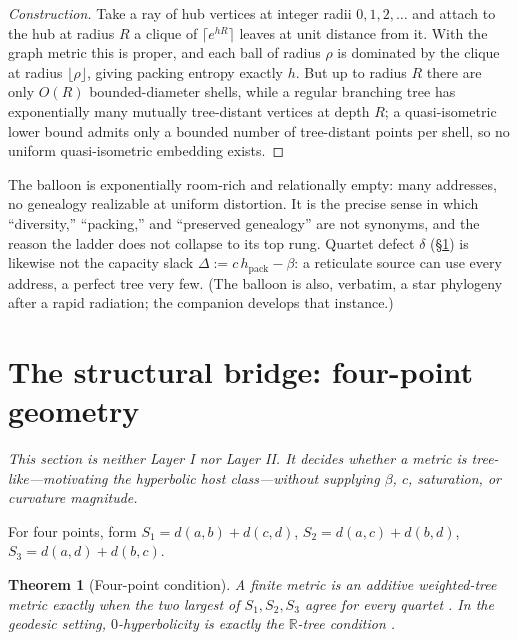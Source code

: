 \documentclass[11pt,reqno]{amsart}
\theoremstyle{plain}
\newtheorem{theorem}{Theorem}[section]
\theoremstyle{definition}
\newcommand{\hpack}{h_{\mathrm{pack}}}
\begin{document}
\begin{proof}[Construction]
Take a ray of hub vertices at integer radii $0,1,2,\dots$ and attach to the hub at radius $R$ a clique of $\lceil e^{hR}\rceil$ leaves at unit distance from it. With the graph metric this is proper, and each ball of radius $\rho$ is dominated by the clique at radius $\lfloor\rho\rfloor$, giving packing entropy exactly $h$. But up to radius $R$ there are only $O(R)$ bounded-diameter shells, while a regular branching tree has exponentially many mutually tree-distant vertices at depth $R$; a quasi-isometric lower bound admits only a bounded number of tree-distant points per shell, so no uniform quasi-isometric embedding exists.
\end{proof}

The balloon is exponentially room-rich and relationally empty: many addresses, no genealogy realizable at uniform distortion. It is the precise sense in which ``diversity,'' ``packing,'' and ``preserved genealogy'' are not synonyms, and the reason the ladder does not collapse to its top rung. Quartet defect $\delta$ (\S\ref{sec:classifier}) is likewise not the capacity slack $\Delta:=c\,\hpack-\beta$: a reticulate source can use every address, a perfect tree very few. (The balloon is also, verbatim, a star phylogeny after a rapid radiation; the companion develops that instance.)

\section{The structural bridge: four-point geometry}\label{sec:classifier}

\emph{This section is neither Layer I nor Layer II. It decides whether a metric is tree-like---motivating the hyperbolic host class---without supplying $\beta$, $c$, saturation, or curvature magnitude.}

For four points, form $S_1=d(a,b)+d(c,d)$, $S_2=d(a,c)+d(b,d)$, $S_3=d(a,d)+d(b,c)$.

\begin{theorem}[Four-point condition]\label{thm:fourpoint}
A finite metric is an additive weighted-tree metric exactly when the two largest of $S_1,S_2,S_3$ agree for every quartet \cite{buneman1971}. In the geodesic setting, $0$-hyperbolicity is exactly the $\mathbb R$-tree condition \cite{gromov1987}.
\end{theorem}
\end{document}
